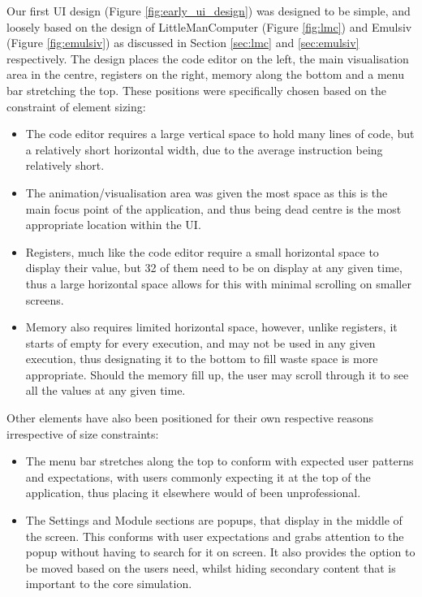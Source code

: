 Our first \ac{UI} design (Figure \ref{fig:early_ui_design}) was designed to be simple, and loosely based on the design of LittleManComputer (Figure \ref{fig:lmc}) and Emulsiv (Figure \ref{fig:emulsiv}) as discussed in Section \ref{sec:lmc} and \ref{sec:emulsiv} respectively. 
The design places the code editor on the left, the main visualisation area in the centre, registers on the right, memory along the bottom and a menu bar stretching the top. These positions were specifically chosen based on the constraint of element sizing:
\begin{itemize}
    \item The code editor requires a large vertical space to hold many lines of code, but a relatively short horizontal width, due to the average instruction being relatively short.
    \item The animation/visualisation area was given the most space as this is the main focus point of the application, and thus being dead centre is the most appropriate location within the \ac{UI}.
    \item Registers, much like the code editor require a small horizontal space to display their value, but 32 of them need to be on display at any given time, thus a large horizontal space allows for this with minimal scrolling on smaller screens.
    \item Memory also requires limited horizontal space, however, unlike registers, it starts of empty for every execution, and may not be used in any given execution, thus designating it to the bottom to fill waste space is more appropriate. Should the memory fill up, the user may scroll through it to see all the values at any given time.
\end{itemize}

Other elements have also been positioned for their own respective reasons irrespective of size constraints:
\begin{itemize}
    \item The menu bar stretches along the top to conform with expected user patterns and expectations, with users commonly expecting it at the top of the application, thus placing it elsewhere would of been unprofessional.
    \item The Settings and Module sections are popups, that display in the middle of the screen. This conforms with user expectations and grabs attention to the popup without having to search for it on screen. It also provides the option to be moved based on the users need, whilst hiding secondary content that is important to the core simulation.
\end{itemize}

